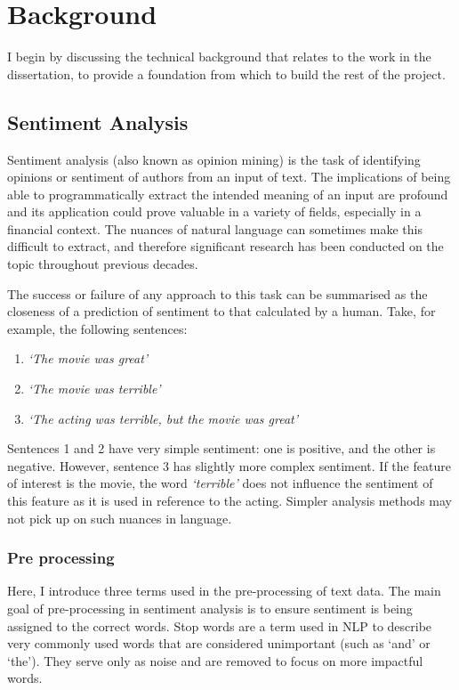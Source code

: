\chapter{Background}
\label{chap:technical}

I begin by discussing the technical background that relates to the work in the dissertation, to provide a foundation from which to build the rest of the project.

\section{Sentiment Analysis}
Sentiment analysis (also known as opinion mining) is the task of identifying opinions or sentiment of authors from an input of text. The implications of being able to programmatically extract the intended meaning of an input are profound and its application could prove valuable in a variety of fields, especially in a financial context. The nuances of natural language can sometimes make this difficult to extract, and therefore significant research has been conducted on the topic throughout previous decades.

The success or failure of any approach to this task can be summarised as the closeness of a prediction of sentiment to that calculated by a human. Take, for example, the following sentences:

\begin{enumerate}
\item \textit{`The movie was great'}
\item \textit{`The movie was terrible'}
\item \textit{`The acting was terrible, but the movie was great'}
\end{enumerate}

Sentences 1 and 2 have very simple sentiment: one is positive, and the other is negative. However, sentence 3 has slightly more complex sentiment. If the feature of interest is the movie, the word \textit{`terrible'} does not influence the sentiment of this feature as it is used in reference to the acting. Simpler analysis methods may not pick up on such nuances in language.

\subsection{Pre processing}
Here, I introduce three terms used in the pre-processing of text data. The main goal of pre-processing in sentiment analysis is to ensure sentiment is being assigned to the correct words. Stop words are a term used in NLP to describe very commonly used words that are considered unimportant (such as `and' or `the'). They serve only as noise and are removed to focus on more impactful words. 

